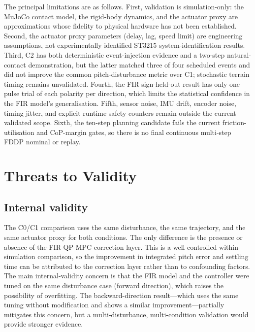 \documentclass[12pt,a4paper]{report}
\begin{document}
The principal limitations are as follows. First, validation is simulation-only: the MuJoCo contact model, the rigid-body dynamics, and the actuator proxy are approximations whose fidelity to physical hardware has not been established. Second, the actuator proxy parameters (delay, lag, speed limit) are engineering assumptions, not experimentally identified ST3215 system-identification results. Third, C2 has both deterministic event-injection evidence and a two-step natural-contact demonstration, but the latter matched three of four scheduled events and did not improve the common pitch-disturbance metric over C1; stochastic terrain timing remains unvalidated. Fourth, the FIR sign-held-out result has only one pulse trial of each polarity per direction, which limits the statistical confidence in the FIR model's generalisation. Fifth, sensor noise, IMU drift, encoder noise, timing jitter, and explicit runtime safety counters remain outside the current validated scope. Sixth, the ten-step planning candidate fails the current friction-utilisation and CoP-margin gates, so there is no final continuous multi-step FDDP nominal or replay.
 
\section{Threats to Validity}
 
\subsection{Internal validity}
The C0/C1 comparison uses the same disturbance, the same trajectory, and the same actuator proxy for both conditions. The only difference is the presence or absence of the FIR-QP-MPC correction layer. This is a well-controlled within-simulation comparison, so the improvement in integrated pitch error and settling time can be attributed to the correction layer rather than to confounding factors. The main internal-validity concern is that the FIR model and the controller were tuned on the same disturbance case (forward direction), which raises the possibility of overfitting. The backward-direction result---which uses the same tuning without modification and shows a similar improvement---partially mitigates this concern, but a multi-disturbance, multi-condition validation would provide stronger evidence.
 
\end{document}
